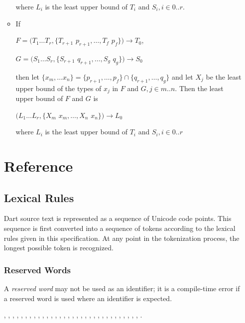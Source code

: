\documentclass{article}
\begin{document}
\begin{itemize}
\begin{itemize}
where $L_i$
is the least upper bound of $T_i$ and $S_i, i \in 0..r$.
\item If

$F= (T_1 \ldots T_r, \{T_{r+1}$  $p_{r+1}, \ldots, T_f$ $p_f\}) \longrightarrow T_0$,

$G= (S_1 \ldots S_r, \{ S_{r+1}$  $q_{r+1}, \ldots, S_g$ $q_g\}) \longrightarrow S_0$

then let $\{x_m, \ldots x_n\}  = \{p_{r+1}, \ldots, p_f\} \cap \{q_{r+1}, \ldots, q_g\}$ and let $X_j$ be the least upper bound of the types of $x_j$ in $F$ and $G, j \in m..n$. Then
the least upper bound of $F$ and $G$ is

$(L_1 \ldots L_r, \{ X_m$ $x_m, \ldots, X_n$ $x_n\}) \longrightarrow L_0$

where $L_i$ is the least upper bound of $T_i$ and $S_i, i \in 0..r$
\end{itemize}


\section{Reference}

\subsection{Lexical Rules}

\LMHash{}
Dart source text is represented as a sequence of Unicode code points.  This sequence is first converted into a sequence of tokens according to the lexical rules given in this specification.  At any point in the tokenization process, the longest possible token is recognized.

\subsubsection{Reserved Words}

\LMHash{}
A {\em reserved word} may not be used as an identifier; it is a compile-time error if a reserved word is used where an identifier is expected.

\ASSERT{}, \BREAK{}, \CASE{}, \CATCH{}, \CLASS{}, \CONST{}, \CONTINUE{}, \DEFAULT{}, \DO{}, \ELSE{}, \ENUM{}, \EXTENDS{}, \FALSE{}, \FINAL{}, \FINALLY{}, \FOR{}, \IF{}, \IN{}, \IS{}, \NEW{}, \NULL{}, \RETHROW, \RETURN{}, \SUPER{}, \SWITCH{}, \THIS{}, \THROW{}, \TRUE{}, \TRY{}, \VAR{}, \VOID{}, \WHILE{}, \WITH{}.




\end{itemize}
\end{document}
